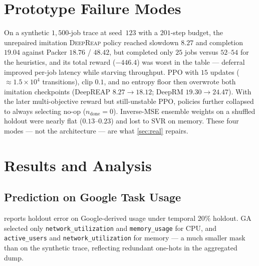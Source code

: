 \documentclass[runningheads]{llncs}
\newcommand{\deepreap}{\textsc{DeepReap}}
\begin{document}
\section{Prototype Failure Modes}\label{sec:failure}
On a synthetic $1{,}500$-job trace at seed~$123$ with a $201$-step
budget, the unrepaired imitation \deepreap{} policy reached slowdown
$8.27$ and completion $19.04$ against Packer $18.76$ / $48.42$, but
completed only $25$ jobs versus $52$--$54$ for the heuristics, and its
total reward ($-446.4$) was worst in the table --- deferral improved
per-job latency while starving throughput. PPO with $15$ updates
($\approx1.5{\times}10^4$ transitions), clip $0.1$, and no entropy
floor then overwrote both imitation checkpoints (DeepREAP
$8.27\!\to\!18.12$; DeepRM $19.30\!\to\!24.47$). With the later
multi-objective reward but still-unstable PPO, policies further
collapsed to always selecting no-op ($n_{\mathrm{done}}=0$). Inverse-MSE
ensemble weights on a shuffled holdout were nearly flat
($0.13$--$0.23$) and lost to SVR on memory. These four modes --- not
the architecture --- are what \cref{sec:real} repairs.

\section{Results and Analysis}
\subsection{Prediction on Google Task Usage}\label{sec:pred-perf}
 reports holdout error on Google-derived usage under
temporal $20\%$ holdout. GA selected only
\texttt{network\_utilization} and \texttt{memory\_usage} for CPU, and
\texttt{active\_users} and \texttt{network\_utilization} for memory ---
a much smaller mask than on the synthetic trace, reflecting redundant
one-hots in the aggregated dump.
\end{document}
